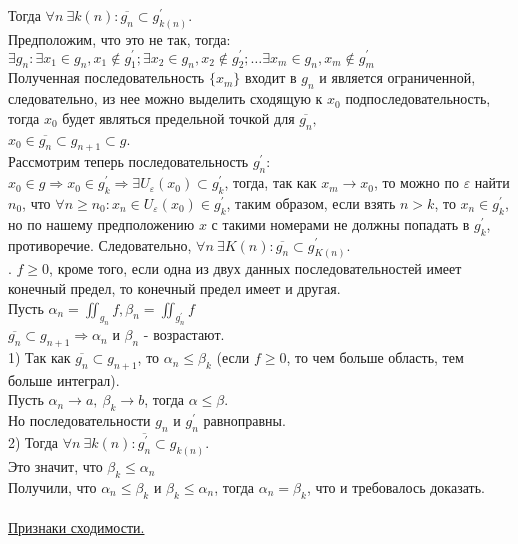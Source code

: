 \documentclass[12pt]{article}
\begin{document}
Тогда $\forall n \ \exists k(n) : \overline{g_n} \subset g^{'}_{k(n)}$.\\
Предположим, что это не так, тогда:\\
$\exists g_n : \exists x_1 \in g_n, x_1 \notin g^{'}_1; \exists x_2 \in g_n, x_2 \notin g^{'}_2; \dots \exists x_m \in g_n, x_m \notin g^{'}_m$\\
Полученная последовательность $\{x_m\}$ входит в $g_n$ и является ограниченной, следовательно, из нее можно выделить сходящую к $x_0$ подпоследовательность, тогда $x_0$ будет являться предельной точкой для $\overline{g_n},$\\ $x_0 \in \overline{g_n} \subset g_{n+1} \subset g$.\\
Рассмотрим теперь последовательность $g^{'}_n:$\\ $x_0 \in g \Rightarrow x_0 \in g^{'}_k \Rightarrow \exists U_\varepsilon (x_0) \subset g^{'}_k$, тогда, так как $x_m \to x_0$, то можно по $\varepsilon$ найти $n_0$, что $\forall n \geq n_0 : x_n \in U_\varepsilon(x_0) \in g^{'}_k$, таким образом, если взять $n > k$, то $x_n \in g^{'}_k$, но по нашему предположению $x$ с такими номерами не должны попадать в $g^{'}_k$, противоречие. Следовательно, $\forall n \ \exists K(n) : \overline{g_n} \subset g^{'}_{K(n)}$.\\
. $f \geq 0$, кроме того, если одна из двух данных последовательностей имеет конечный предел, то конечный предел имеет и другая.\\
Пусть $\alpha_n = \iint_{g_n} f, \beta_n = \iint_{g^{'}_n} f$\\
$\overline{g_n} \subset g_{n+1} \Rightarrow \alpha_n$ и $\beta_n$ - возрастают.\\
1) Так как $\overline{g_n} \subset g_{n+1}$, то $\alpha_n \leq \beta_k$ (если $f \geq 0$, то чем больше область, тем больше интеграл).\\
Пусть $\alpha_n \to a, \ \beta_k \to b$, тогда $\alpha \leq \beta$.\\
Но последовательности $g_n$ и $g^{'}_n$ равноправны.\\
2) Тогда $\forall n \ \exists k(n) : \overline{g^{'}_n} \subset g_{k(n)}$.\\
Это значит, что $\beta_k \leq \alpha_n$\\
Получили, что $\alpha_n \leq \beta_k$ и $\beta_k \leq \alpha_n$, тогда $\alpha_n = \beta_k$, что и требовалось доказать.\\
\\
\label{question24_3}\uline{Признаки сходимости.}\\
\end{document}
